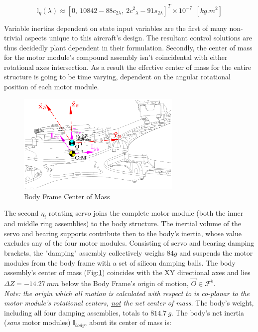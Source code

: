 \begin{equation}\label{eq:inertia.middle.vpa}
\mathbb{I}_\eta(\lambda)\approx[0,~ 10842-88{c}_{2\lambda},~ 2{c^2}_{\lambda}-91s_{2\lambda}]^T\times10^{-7}~~[kg.m^2]
\end{equation}
\par
Variable inertias dependent on state input variables are the first of many non-trivial aspects unique to this aircraft's design. The resultant control solutions are thus decidedly plant dependent in their formulation. Secondly, the center of mass for the motor module's compound assembly isn't coincidental with either rotational axes intersection. As a result the effective center of mass for the entire structure is going to be time varying, dependent on the angular rotational position of each motor module.
\par
\begin{figure}[htbp]
\centering
\includegraphics[width=0.7\textwidth]{figs/inertia-center}
\caption{Body Frame Center of Mass}
\label{fig:inertia-center}
\end{figure}
The second $\eta_i$ rotating servo joins the complete motor module (both the inner and middle ring assemblies) to the body structure. The inertial volume of the servo and bearing supports contribute then to the body's inertia, whose value excludes any of the four motor modules. Consisting of servo and bearing damping brackets, the "damping" assembly collectively weighs $84g$ and suspends the motor modules from the body frame with a set of silicon damping balls. The body assembly's center of mass (Fig:\ref{fig:inertia-center}) coincides with the XY directional axes and lies $\Delta Z=-14.27~mm$ below the Body Frame's origin of motion, $\vec{O}\in\mathcal{F}^b$.
\\
\emph{\color{Gray}Note: the origin which all motion is calculated with respect to is co-planar to the motor module's rotational centers, \underline{not} the net center of mass.}
\newpage
The body's weight, including all four damping assemblies, totals to $814.7~g$. The body's net inertia (\emph{sans} motor modules) $\mathbb{I}_{body}$, about its center of mass is:

